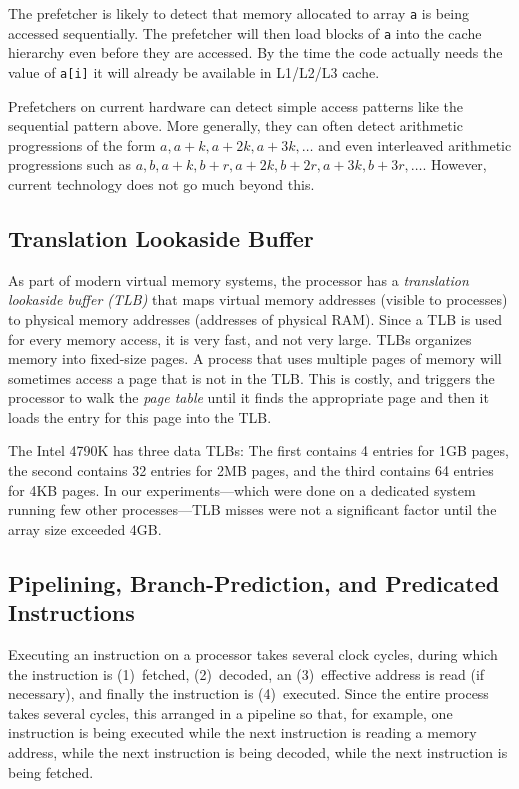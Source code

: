 \documentclass{patmorin}
\begin{document}
The prefetcher is likely to detect that memory allocated to array
\texttt{a} is being accessed sequentially.  The prefetcher will
then load blocks of \texttt{a} into the cache hierarchy even
before they are accessed.  By the time the code actually needs the value
of \texttt{a[i]} it will already be available in L1/L2/L3 cache.

Prefetchers on current hardware can detect simple access patterns
like the sequential pattern above.  More generally, they can often
detect arithmetic progressions of the form $a,a+k,a+2k,a+3k,\ldots$
and even interleaved arithmetic progressions such as $a, b, a+k, b+r,
a+2k,b+2r,a+3k,b+3r,\ldots$.  However, current technology does not go
much beyond this.

\subsection{Translation Lookaside Buffer}

As part of modern virtual memory systems, the processor has a
\emph{translation lookaside buffer (TLB)} that maps virtual memory
addresses (visible to processes) to physical memory addresses (addresses
of physical RAM).  Since a TLB is used for every memory access, it is very
fast, and not very large.  TLBs organizes memory into fixed-size pages.
A process that uses multiple pages of memory will sometimes access a
page that is not in the TLB. This is costly, and triggers the processor
to walk the \emph{page table} until it finds the appropriate page and
then it loads the entry for this page into the TLB.

The Intel 4790K has three data TLBs: The first contains 4 entries for
1GB pages, the second contains 32 entries for 2MB pages, and the third
contains 64 entries for 4KB pages.  In our experiments---which were done
on a dedicated system running few other processes---TLB misses were not
a significant factor until the array size exceeded 4GB.



\subsection{Pipelining, Branch-Prediction, and Predicated Instructions}

Executing an instruction on a processor takes several clock cycles, during
which the instruction is (1)~fetched, (2)~decoded, an (3)~effective
address is read (if necessary), and finally the instruction is
(4)~executed.  Since the entire process takes several cycles, this
arranged in a pipeline so that, for example, one instruction is being
executed while the next instruction is reading a memory address, while
the next instruction is being decoded, while the next instruction is
being fetched.
\end{document}
